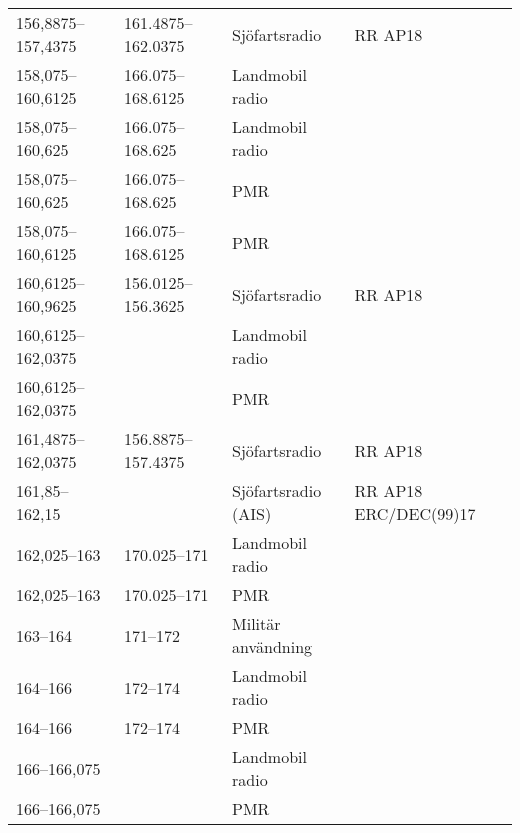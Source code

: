 \begin{landscape}
\begin{longtable}{llll}
	156,8875--157,4375 & 161.4875--162.0375 & Sjöfartsradio                         & RR AP18                        \\
	158,075--160,6125  & 166.075--168.6125  & Landmobil radio                       &                                \\
	158,075--160,625   & 166.075--168.625   & Landmobil radio                       &                                \\
	158,075--160,625   & 166.075--168.625   & PMR                                   &                                \\
	158,075--160,6125  & 166.075--168.6125  & PMR                                   &                                \\
	160,6125--160,9625 & 156.0125--156.3625 & Sjöfartsradio                         & RR AP18                        \\
	160,6125--162,0375 &                    & Landmobil radio                       &                                \\
	160,6125--162,0375 &                    & PMR                                   &                                \\
	161,4875--162,0375 & 156.8875--157.4375 & Sjöfartsradio                         & RR AP18                        \\
	161,85--162,15     &                    & Sjöfartsradio (AIS)                   & RR AP18 ERC/DEC(99)17          \\
	162,025--163       & 170.025--171       & Landmobil radio                       &                                \\
	162,025--163       & 170.025--171       & PMR                                   &                                \\
	163--164           & 171--172           & Militär användning                    &                                \\
	164--166           & 172--174           & Landmobil radio                       &                                \\
	164--166           & 172--174           & PMR                                   &                                \\
	166--166,075       &                    & Landmobil radio                       &                                \\
	166--166,075       &                    & PMR                                   &                                \\

\end{longtable}
\end{landscape}
